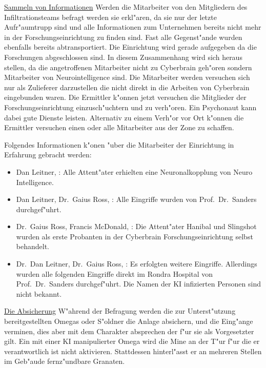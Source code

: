 \underline{Sammeln von Informationen} Werden die Mitarbeiter von den Mitgliedern des Infiltrationsteams befragt werden sie erkl"aren, da\3 
sie nur der letzte Aufr"aumtrupp sind und alle Informationen zum Unternehmen bereits nicht mehr in der Forschungseinrichtung zu finden sind. Fast alle Gegenst"ande wurden ebenfalls bereits abtransportiert. Die Einrichtung wird gerade aufgegeben da die Forschungen abgeschlossen sind. In diesem Zusammenhang wird sich heraus stellen, da\3 die angetroffenen Mitarbeiter nicht zu Cyberbrain geh"oren sondern Mitarbeiter von Neurointelligence sind. Die Mitarbeiter werden versuchen sich nur als Zulieferer darzustellen die nicht direkt in die Arbeiten von Cyberbrain eingebunden waren. Die Ermittler k"onnen jetzt versuchen die Mitglieder der Forschungseinrichtung einzusch"uchtern und zu verh"oren. Ein Psychonaut kann dabei gute Dienste leisten. Alternativ zu einem Verh"or vor Ort k"onnen die Ermittler versuchen einen oder alle Mitarbeiter aus der Zone zu schaffen. 

Folgendes Informationen k"onen "uber die Mitarbeiter der Einrichtung in Erfahrung gebracht werden:

\begin{itemize}
	\item Dan Leitner, \ml{}: Alle Attent"ater erhielten eine Neuronalkopplung von Neuro Intelligence.
	\item Dan Leitner, Dr.~Gaius Ross, \ml{}: Alle Eingriffe wurden von Prof.~Dr.~Sanders durchgef"uhrt.
	\item Dr.~Gaius Ross, Francis McDonald, \ml{}: Die Attent"ater Hanibal und Slingshot wurden als erste Probanten in der Cyberbrain 			Forschungseinrichtung selbst behandelt.	
	\item Dr.~Dan Leitner, Dr.~Gaius Ross, \ml{}: Es erfolgten weitere Eingriffe. Allerdings wurden alle folgenden Eingriffe direkt im 			Rondra Hospital von Prof.~Dr.~Sanders durchgef"uhrt. Die Namen der KI infizierten Personen sind nicht bekannt.
\end{itemize}

\underline{Die Absicherung} W"ahrend der Befragung werden die zur Unterst"utzung bereitgestellten Omegas oder S"oldner die Anlage absichern, und die Eing"ange verminen, dies aber mit dem Charakter absprechen der f"ur sie als Vorgesetzter gilt. Ein mit einer KI manipulierter Omega wird die Mine an der T"ur f"ur die er verantwortlich ist nicht aktivieren. Stattdessen hinterl"asst er an mehreren Stellen im Geb"aude fernz"undbare Granaten.

